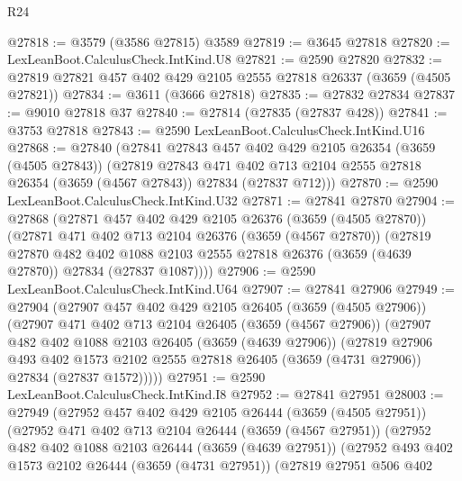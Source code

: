 \begin{lexlean}{R24}
\begin{coremodule}
@27818 := @3579 (@3586 @27815) @3589
@27819 := @3645 @27818
@27820 := LexLeanBoot.CalculusCheck.IntKind.U8
@27821 := @2590 @27820
@27832 := @27819 @27821 @457 @402 @429 @2105 @2555 @27818 @26337 (@3659 (@4505 @27821))
@27834 := @3611 (@3666 @27818)
@27835 := @27832 @27834
@27837 := @9010 @27818 @37
@27840 := @27814 (@27835 (@27837 @428))
@27841 := @3753 @27818
@27843 := @2590 LexLeanBoot.CalculusCheck.IntKind.U16
@27868 := @27840
    (@27841
      @27843
      @457
      @402
      @429
      @2105
      @26354
      (@3659 (@4505 @27843))
      (@27819
        @27843
        @471
        @402
        @713
        @2104
        @2555
        @27818
        @26354
        (@3659 (@4567 @27843))
        @27834
        (@27837 @712)))
@27870 := @2590 LexLeanBoot.CalculusCheck.IntKind.U32
@27871 := @27841 @27870
@27904 := @27868
    (@27871
      @457
      @402
      @429
      @2105
      @26376
      (@3659 (@4505 @27870))
      (@27871
        @471
        @402
        @713
        @2104
        @26376
        (@3659 (@4567 @27870))
        (@27819
          @27870
          @482
          @402
          @1088
          @2103
          @2555
          @27818
          @26376
          (@3659 (@4639 @27870))
          @27834
          (@27837 @1087))))
@27906 := @2590 LexLeanBoot.CalculusCheck.IntKind.U64
@27907 := @27841 @27906
@27949 := @27904
    (@27907
      @457
      @402
      @429
      @2105
      @26405
      (@3659 (@4505 @27906))
      (@27907
        @471
        @402
        @713
        @2104
        @26405
        (@3659 (@4567 @27906))
        (@27907
          @482
          @402
          @1088
          @2103
          @26405
          (@3659 (@4639 @27906))
          (@27819
            @27906
            @493
            @402
            @1573
            @2102
            @2555
            @27818
            @26405
            (@3659 (@4731 @27906))
            @27834
            (@27837 @1572)))))
@27951 := @2590 LexLeanBoot.CalculusCheck.IntKind.I8
@27952 := @27841 @27951
@28003 := @27949
    (@27952
      @457
      @402
      @429
      @2105
      @26444
      (@3659 (@4505 @27951))
      (@27952
        @471
        @402
        @713
        @2104
        @26444
        (@3659 (@4567 @27951))
        (@27952
          @482
          @402
          @1088
          @2103
          @26444
          (@3659 (@4639 @27951))
          (@27952
            @493
            @402
            @1573
            @2102
            @26444
            (@3659 (@4731 @27951))
            (@27819
              @27951
              @506
              @402

\end{coremodule}
\end{lexlean}
